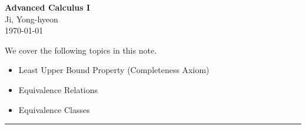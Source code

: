 \documentclass[11pt,openany]{article}
\begin{document}
\begin{center}
	\huge\textbf{Advanced Calculus I}\\
	\vspace{0.5em}
	\large{Ji, Yong-hyeon}\\
	\vspace{0.5em}
	\normalsize{\today}\\
\end{center}

\noindent We cover the following topics in this note.
\begin{itemize}
	\item Least Upper Bound Property (Completeness Axiom)
	\item Equivalence Relations
	\item Equivalence Classes
\end{itemize}
\hrule\vspace{12pt}
\begin{remark*}
\ \begin{center}

\end{center}
\end{remark*}
\end{document}
